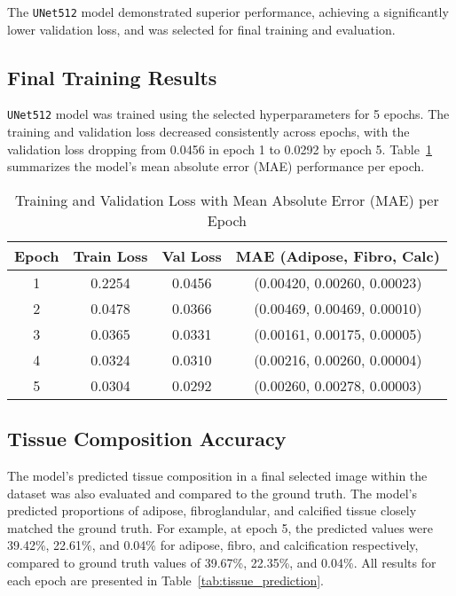 The \texttt{UNet512} model demonstrated superior performance, achieving a significantly lower validation 
loss, and was selected for final training and evaluation.

\subsection{Final Training Results}

\texttt{UNet512} model was trained using the selected hyperparameters for 5 epochs. The training and validation 
loss decreased consistently across epochs, with the validation loss dropping from 0.0456 in epoch 1 to 0.0292 by 
epoch 5. Table~\ref{tab:final_metrics} summarizes the model's mean absolute error (MAE) performance per epoch.

\begin{table}[h]
\centering
\caption{Training and Validation Loss with Mean Absolute Error (MAE) per Epoch}
\label{tab:final_metrics}
\begin{tabular}{cccc}
\toprule
\textbf{Epoch} & \textbf{Train Loss} & \textbf{Val Loss} & \textbf{MAE (Adipose, Fibro, Calc)} \\
\midrule
1 & 0.2254 & 0.0456 & (0.00420, 0.00260, 0.00023) \\
2 & 0.0478 & 0.0366 & (0.00469, 0.00469, 0.00010) \\
3 & 0.0365 & 0.0331 & (0.00161, 0.00175, 0.00005) \\
4 & 0.0324 & 0.0310 & (0.00216, 0.00260, 0.00004) \\
5 & 0.0304 & 0.0292 & (0.00260, 0.00278, 0.00003) \\
\bottomrule
\end{tabular}
\end{table}


\subsection{Tissue Composition Accuracy}

The model's predicted tissue composition in a final selected image within the dataset was also evaluated and compared to the ground 
truth. The model's predicted proportions of adipose, fibroglandular, and calcified tissue closely matched the ground truth. 
For example, at epoch 5, the predicted values were 39.42\%, 22.61\%, and 0.04\% for adipose, fibro, and calcification respectively, 
compared to ground truth values of 39.67\%, 22.35\%, and 0.04\%. All results for each epoch are presented in Table~\ref{tab:tissue_prediction}.

